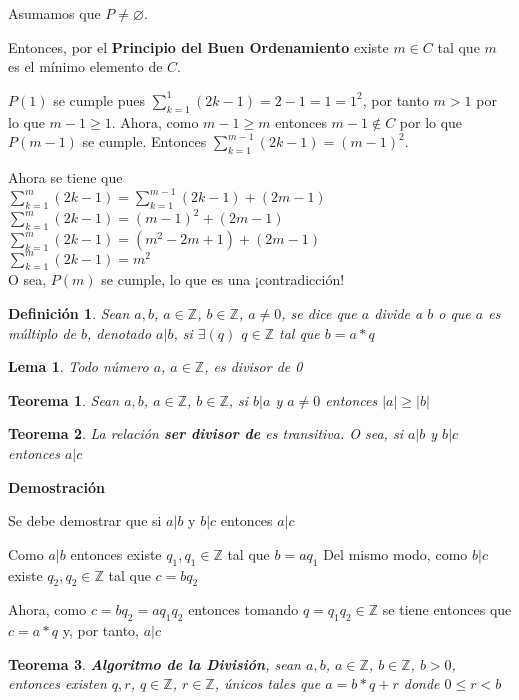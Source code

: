 \documentclass[a4paper,1pt]{report}
\newtheorem*{teo}{Teorema}
\newtheorem*{dfn}{Definición}
\newtheorem*{lem}{Lema}
\begin{document}
Asumamos que $P\neq \varnothing$. 

Entonces, por el \textbf{Principio del Buen Ordenamiento} existe $m\in C$ tal que $m$ es el mínimo elemento de $C$.

$P(1)$ se cumple pues $\sum^1_{k=1}(2k-1)=2-1=1=1^2$, por tanto $m>1$ por lo que $m-1\geq1$. Ahora, como $m-1\geq m$ entonces $m-1\notin C$ por lo que $P(m-1)$ se cumple. Entonces $\sum^{m-1}_{k=1}(2k-1)=(m-1)^2$.

Ahora se tiene que\\ 
$\sum^m_{k=1}(2k-1)=\sum^{m-1}_{k=1}(2k-1)+(2m-1)$\\
$\sum^m_{k=1}(2k-1)=(m-1)^2+(2m-1)$\\
$\sum^m_{k=1}(2k-1)=(m^2-2m+1)+(2m-1)$\\
$\sum^m_{k=1}(2k-1)=m^2$\\
O sea, $P(m)$ se cumple, lo que es una ¡contradicción!

\begin{dfn}
 Sean $a,b$, $a\in\mathbb{Z}$, $b\in\mathbb{Z}$, $a\neq 0$, se dice que $a$ divide a $b$ o que $a$ es múltiplo de $b$, denotado $a|b$, si $\exists(q)$ $q\in\mathbb{Z}$ tal que $b=a*q$
\end{dfn}

\begin{lem}
 Todo número $a$, $a\in\mathbb{Z}$, es divisor de 0
\end{lem}

\begin{teo}
 Sean $a,b$, $a\in\mathbb{Z}$, $b\in\mathbb{Z}$, si $b|a$ y $a\neq 0$ entonces $|a| \geq |b|$
\end{teo}



\begin{teo}
 La relación \textbf{ser divisor de} es transitiva. O sea, si $a|b$ y $b|c$ entonces $a|c$
\end{teo}

\textbf{Demostración}

Se debe demostrar que si $a|b$ y $b|c$ entonces $a|c$

Como $a|b$ entonces existe $q_1, q_1\in\mathbb{Z}$ tal que $b=aq_1$
Del mismo modo, como $b|c$ existe $q_2, q_2\in\mathbb{Z}$ tal que $c=bq_2$

Ahora, como $c=bq_2=aq_1q_2$ entonces tomando $q=q_1q_2\in\mathbb{Z}$ se tiene entonces que $c=a*q$ y, por tanto, $a|c$ 

\begin{teo}
 \textbf{Algoritmo de la División}, sean $a,b$, $a\in\mathbb{Z}$, $b\in\mathbb{Z}$, $b > 0$, entonces existen $q,r$, $q\in\mathbb{Z}$, $r\in\mathbb{Z}$, únicos tales que $a = b*q+r$ donde $0\leq r < b$
\end{teo}
\end{document}
